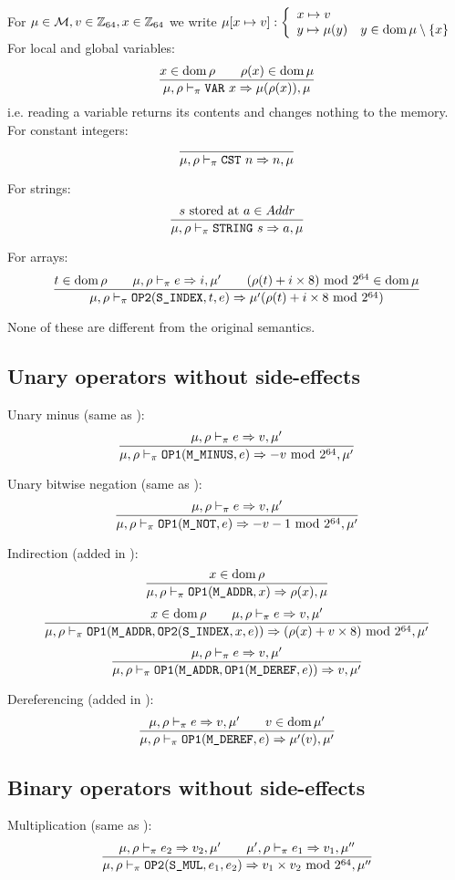 For \(\mu\in\mathcal{M}, v\in\mathbb{Z}_{64}, x\in\mathbb{Z}_{64}\) we write \(\mu[x\mapsto v]: \left\{\begin{array}{ll}x\mapsto v & \\ y\mapsto \mu(y) & y\in \operatorname{dom}\mu\setminus\{x\}\end{array}\right.\)
For local and global variables:
\[\dfrac{x\in\operatorname{dom}\rho \qquad \rho(x)\in\operatorname{dom}\mu}{\mu,\rho\vdash_\pi \texttt{VAR}\ x\Rightarrow \mu(\rho(x)), \mu}\]
i.e. reading a variable returns its contents and changes nothing to the memory.\\

For constant integers:
\[\dfrac{}{\mu,\rho\vdash_\pi \texttt{CST}\ n\Rightarrow n, \mu}\]

For strings:
\[\dfrac{s\text{ stored at }a\in Addr}{\mu,\rho\vdash_\pi \texttt{STRING}\ s\Rightarrow a, \mu}\]

For arrays:
\[\dfrac{t\in\operatorname{dom}\rho \qquad \mu,\rho\vdash_\pi e\Rightarrow i,\mu' \qquad (\rho(t)+i\times 8)\text{ mod } 2^{64}\in\operatorname{dom}\mu}{\mu,\rho\vdash_\pi \texttt{OP2}(\texttt{S\_INDEX}, t, e) \Rightarrow \mu'(\rho(t)+i\times 8 \text{ mod } 2^{64})}\]

None of these are different from the original \Cmm semantics.

\subsection{Unary operators without side-effects}
Unary minus (same as \Cmm):
\[\dfrac{\mu,\rho\vdash_\pi e \Rightarrow v,\mu'}{\mu,\rho\vdash_\pi \texttt{OP1}(\texttt{M\_MINUS}, e) \Rightarrow -v \text{ mod } 2^{64},\mu'}\]

Unary bitwise negation (same as \Cmm):
\[\dfrac{\mu,\rho\vdash_\pi e\Rightarrow v,\mu'}{\mu,\rho\vdash_\pi \texttt{OP1}(\texttt{M\_NOT}, e) \Rightarrow -v-1 \text{ mod } 2^{64},\mu'}\]

Indirection (added in \Cpm):
\[\dfrac{x\in\operatorname{dom}\rho}{\mu,\rho\vdash_\pi \texttt{OP1}(\texttt{M\_ADDR}, x)\Rightarrow \rho(x),\mu}\]
\[\dfrac{x\in\operatorname{dom}\rho \qquad \mu,\rho\vdash_\pi e\Rightarrow v,\mu'}{\mu,\rho\vdash_\pi \texttt{OP1}(\texttt{M\_ADDR}, \texttt{OP2}(\texttt{S\_INDEX}, x, e)) \Rightarrow (\rho(x)+v\times 8) \text{ mod } 2^{64}, \mu'}\]
\[\dfrac{\mu,\rho\vdash_\pi e\Rightarrow v,\mu'}{\mu,\rho\vdash_\pi \texttt{OP1}(\texttt{M\_ADDR}, \texttt{OP1}(\texttt{M\_DEREF}, e)) \Rightarrow v,\mu'}\]

Dereferencing (added in \Cpm):
\[\dfrac{\mu,\rho\vdash_\pi e\Rightarrow v,\mu' \qquad v\in\operatorname{dom}\mu'}{\mu,\rho\vdash_\pi \texttt{OP1}(\texttt{M\_DEREF}, e) \Rightarrow \mu'(v),\mu'}\]

\subsection{Binary operators without side-effects}
Multiplication (same as \Cmm):
\[\dfrac{\mu,\rho\vdash_\pi e_2\Rightarrow v_2,\mu' \qquad \mu',\rho\vdash_\pi e_1\Rightarrow v_1,\mu''}{\mu,\rho\vdash_\pi \texttt{OP2}(\texttt{S\_MUL}, e_1, e_2) \Rightarrow v_1\times v_2\text{ mod } 2^{64},\mu''}\]

